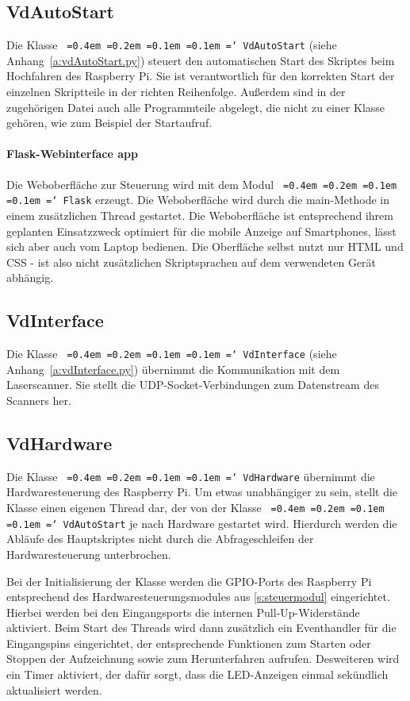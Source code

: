 \documentclass[a4paper,12pt,bibliography=totoc, listof=totoc,titlepage,pointlessnumbers]{scrreprt}
\newcommand*\justify{%
  \fontdimen2\font=0.4em%
  \fontdimen3\font=0.2em%
  \fontdimen4\font=0.1em%
  \fontdimen7\font=0.1em%
  \hyphenchar\font=`\-%
}
\newcommand{\code}[1]{\texttt{\justify{#1}}}
\begin{document}
\subsection{VdAutoStart}
Die Klasse \code{VdAutoStart} (siehe Anhang~\ref{a:vdAutoStart.py}) steuert den automatischen Start des Skriptes beim Hochfahren des Raspberry Pi. Sie ist verantwortlich für den korrekten Start der einzelnen Skriptteile in der richten Reihenfolge. Außerdem sind in der zugehörigen Datei auch alle Programmteile abgelegt, die nicht zu einer Klasse gehören, wie zum Beispiel der Startaufruf.

\paragraph{Flask-Webinterface app}
Die Weboberfläche zur Steuerung wird mit dem Modul \code{Flask} erzeugt. Die Weboberfläche wird durch die main-Methode in einem zusätzlichen Thread gestartet.
Die Weboberfläche ist entsprechend ihrem geplanten Einsatzzweck optimiert für die mobile Anzeige auf Smartphones, lässt sich aber auch vom Laptop bedienen. Die Oberfläche selbst nutzt nur HTML und CSS - ist also nicht zusätzlichen Skriptsprachen auf dem verwendeten Gerät abhängig. 

\subsection{VdInterface}
Die Klasse \code{VdInterface} (siehe Anhang~\ref{a:vdInterface.py}) übernimmt die Kommunikation mit dem Laser\-scan\-ner. Sie stellt die UDP-Socket-Verbindungen zum Datenstream des Scanners her.


\subsection{VdHardware}
Die Klasse \code{VdHardware} übernimmt die Hardwaresteuerung des Raspberry Pi. Um etwas unabhängiger zu sein, stellt die Klasse einen eigenen Thread dar, der von der Klasse \code{VdAutoStart} je nach Hardware gestartet wird. Hierdurch werden die Abläufe des Hauptskriptes nicht durch die Abfrageschleifen der Hardwaresteuerung unterbrochen.

Bei der Initialisierung der Klasse werden die GPIO-Ports des Raspberry Pi entsprechend des Hardwaresteuerungsmodules aus \autoref{s:steuermodul} eingerichtet. Hierbei werden bei den Eingangsports die internen Pull-Up-Widerstände aktiviert. Beim Start des Threads wird dann zusätzlich ein Eventhandler für die Eingangspins eingerichtet, der entsprechende Funktionen zum Starten oder Stoppen der Aufzeichnung sowie zum Herunterfahren aufrufen. Desweiteren wird ein Timer aktiviert, der dafür sorgt, dass die LED-Anzeigen einmal sekündlich aktualisiert werden.
\end{document}

